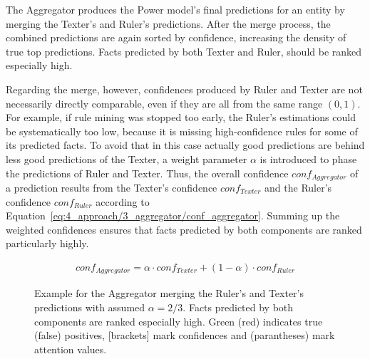 The Aggregator produces the Power model's final predictions for an entity by merging the Texter's and Ruler's predictions. After the merge process, the combined predictions are again sorted by confidence, increasing the density of true top predictions. Facts predicted by both Texter and Ruler, should be ranked especially high.

Regarding the merge, however, confidences produced by Ruler and Texter are not necessarily directly comparable, even if they are all from the same range $(0, 1)$. For example, if rule mining was stopped too early, the Ruler's estimations could be systematically too low, because it is missing high-confidence rules for some of its predicted facts. To avoid that in this case actually good predictions are behind less good predictions of the Texter, a weight parameter $\alpha$ is introduced to phase the predictions of Ruler and Texter. Thus, the overall confidence $conf_{Aggregator}$ of a prediction results from the Texter's confidence $conf_{Texter}$ and the Ruler's confidence $conf_{Ruler}$ according to Equation~\ref{eq:4_approach/3_aggregator/conf_aggregator}. Summing up the weighted confidences ensures that facts predicted by both components are ranked particularly highly.

\begin{align}
    conf_{Aggregator} = \alpha \cdot conf_{Texter} + (1 - \alpha) \cdot conf_{Ruler}
    \label{eq:4_approach/3_aggregator/conf_aggregator}
\end{align}

\begin{figure}[t]
    \caption{Example for the Aggregator merging the Ruler's and Texter's predictions with assumed $\alpha = 2/3$. Facts predicted by both components are ranked especially high. Green (red) indicates true (false) positives, [brackets] mark confidences and (parantheses) mark attention values.}
    \label{fig:4_approach/3_aggregator/lucy}
\end{figure}


